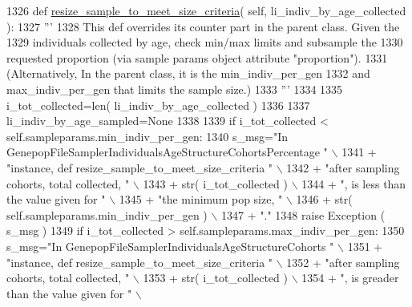 \begin{DoxyCode}
1326     \textcolor{keyword}{def }\hyperlink{classnegui_1_1genepopfilesampler_1_1GenepopFileSamplerIndividualsAgeStructureCohortsPercentage_a84ae04a169f95a289b6aacc21db39a17}{resize\_sample\_to\_meet\_size\_criteria}( self, 
      li\_indiv\_by\_age\_collected ):
1327         \textcolor{stringliteral}{'''}
1328 \textcolor{stringliteral}{        This def overrides its counter part in the parent class.  Given the }
1329 \textcolor{stringliteral}{        individuals collected by age, check min/max limits and subsample the }
1330 \textcolor{stringliteral}{        requested proportion (via sample params object attribute "proportion"). }
1331 \textcolor{stringliteral}{        (Alternatively, In the parent class,  it is the min\_indiv\_per\_gen }
1332 \textcolor{stringliteral}{        and max\_indiv\_per\_gen that limits the sample size.)}
1333 \textcolor{stringliteral}{        '''}
1334 
1335         i\_tot\_collected=len( li\_indiv\_by\_age\_collected )
1336 
1337         li\_indiv\_by\_age\_sampled=\textcolor{keywordtype}{None}
1338 
1339         \textcolor{keywordflow}{if} i\_tot\_collected < self.sampleparams.min\_indiv\_per\_gen:
1340             s\_msg=\textcolor{stringliteral}{"In GenepopFileSamplerIndividualsAgeStructureCohortsPercentage "} \(\backslash\)
1341                     + \textcolor{stringliteral}{"instance, def resize\_sample\_to\_meet\_size\_criteria "} \(\backslash\)
1342                     + \textcolor{stringliteral}{"after sampling cohorts, total collected, "} \(\backslash\)
1343                     + str( i\_tot\_collected ) \(\backslash\)
1344                     + \textcolor{stringliteral}{", is less than the value given for "} \(\backslash\)
1345                     + \textcolor{stringliteral}{"the minimum pop size, "} \(\backslash\)
1346                     + str( self.sampleparams.min\_indiv\_per\_gen ) \(\backslash\)
1347                     + \textcolor{stringliteral}{"."}
1348             \textcolor{keywordflow}{raise} Exception ( s\_msg )
1349         \textcolor{keywordflow}{if} i\_tot\_collected > self.sampleparams.max\_indiv\_per\_gen:
1350             s\_msg=\textcolor{stringliteral}{"In GenepopFileSamplerIndividualsAgeStructureCohorts "} \(\backslash\)
1351                     + \textcolor{stringliteral}{"instance, def resize\_sample\_to\_meet\_size\_criteria "} \(\backslash\)
1352                     + \textcolor{stringliteral}{"after sampling cohorts, total collected, "} \(\backslash\)
1353                     + str( i\_tot\_collected ) \(\backslash\)
1354                     + \textcolor{stringliteral}{", is greader than the value given for "} \(\backslash\)

\end{DoxyCode}
